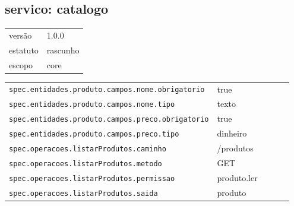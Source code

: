 \subsection*{servico: catalogo}
\begin{tabular}{@{}ll@{}}
versão & 1.0.0 \\
estatuto & rascunho \\
escopo & core \\
\end{tabular}

\begin{tabular}{@{}p{0.35\linewidth}p{0.6\linewidth}@{}}
\texttt{spec.entidades.produto.campos.nome.obrigatorio} & true \\
\texttt{spec.entidades.produto.campos.nome.tipo} & texto \\
\texttt{spec.entidades.produto.campos.preco.obrigatorio} & true \\
\texttt{spec.entidades.produto.campos.preco.tipo} & dinheiro \\
\texttt{spec.operacoes.listarProdutos.caminho} & /produtos \\
\texttt{spec.operacoes.listarProdutos.metodo} & GET \\
\texttt{spec.operacoes.listarProdutos.permissao} & produto.ler \\
\texttt{spec.operacoes.listarProdutos.saida} & produto \\
\end{tabular}
